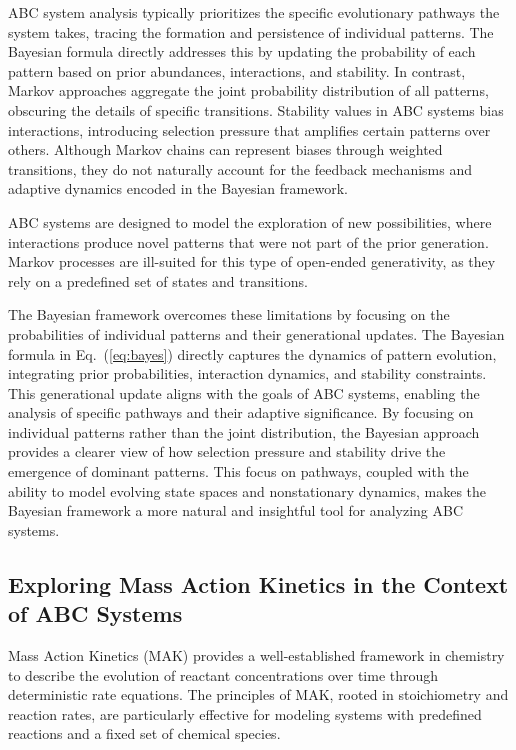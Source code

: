 \documentclass[entropy,article,submit,pdftex,oneauthor]{Definitions/mdpi}
\begin{document}
ABC system analysis typically prioritizes the specific evolutionary pathways the system takes, tracing the formation and persistence of individual patterns. The Bayesian formula directly addresses this by updating the probability of each pattern based on prior abundances, interactions, and stability. In contrast, Markov approaches aggregate the joint probability distribution of all patterns, obscuring the details of specific transitions. Stability values in ABC systems bias interactions, introducing selection pressure that amplifies certain patterns over others. Although Markov chains can represent biases through weighted transitions, they do not naturally account for the feedback mechanisms and adaptive dynamics encoded in the Bayesian framework.

ABC systems are designed to model the exploration of new possibilities, where interactions produce novel patterns that were not part of the prior generation. Markov processes are ill-suited for this type of open-ended generativity, as they rely on a predefined set of states and transitions.

The Bayesian framework overcomes these limitations by focusing on the probabilities of individual patterns and their generational updates. The Bayesian formula in Eq.~(\ref{eq:bayes}) directly captures the dynamics of pattern evolution, integrating prior probabilities, interaction dynamics, and stability constraints. This generational update aligns with the goals of ABC systems, enabling the analysis of specific pathways and their adaptive significance. By focusing on individual patterns rather than the joint distribution, the Bayesian approach provides a clearer view of how selection pressure and stability drive the emergence of dominant patterns. This focus on pathways, coupled with the ability to model evolving state spaces and nonstationary dynamics, makes the Bayesian framework a more natural and insightful tool for analyzing ABC systems.

\subsection{Exploring Mass Action Kinetics in the Context of ABC Systems}

Mass Action Kinetics (MAK) \cite{TuranyiTomlin2014} provides a well-established framework in chemistry to describe the evolution of reactant concentrations over time through deterministic rate equations. The principles of MAK, rooted in stoichiometry and reaction rates, are particularly effective for modeling systems with predefined reactions and a fixed set of chemical species.
\end{document}
